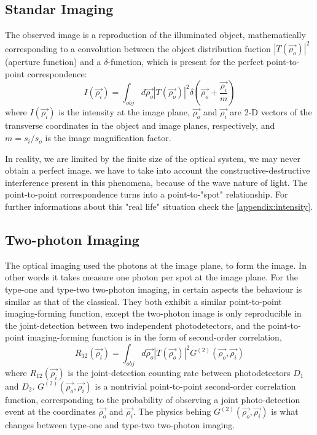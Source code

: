 \subsection{Standar Imaging}

The observed image is a reproduction of the illuminated object, mathematically
corresponding to a convolution between the object distribution fuction $ |T(\vec{\rho_o})|^2$ (aperture function) and a $\delta$-function, which is present for the perfect
point-to-point correspondence\cite{introquantumoptics}:
\begin{equation}
I(\vec{\rho_i})=\int_{obj} d\vec{\rho_o} |T(\vec{\rho_o})|^2 \delta(\vec{\rho_o}+\frac{\vec{\rho_i}}{m})
\end{equation}
where $I(\vec{\rho_i})$ is the intensity at the image plane, $\vec{\rho_o}$ and $\vec{\rho_i}$ are 2-D vectors of the
transverse coordinates in the object and image planes, respectively, and
$m=s_i/s_o$ is the image magnification factor.

In reality, we are limited by the finite size of the optical system, we may never obtain a perfect image.
we have to take into account the constructive-destructive interference present
in this phenomena, because of the wave nature of light. The point-to-point correspondence turns into a point-to-"spot" relationship.
For further informations about this "real life" situation check the \ref{appendix:intensity}.



\subsection{Two-photon Imaging}


The optical imaging used the photons at the image plane, to form the image. In other 
words it takes measure one photon per spot at the image plane. For the type-one and type-two
two-photon imaging, in certain aspects the behaviour is similar as that of the classical.
They both exhibit a similar point-to-point imaging-forming function, except the 
two-photon image is only reproducible in the joint-detection between two independent photodetectors,
and the point-to-point imaging-forming function is in the form of second-order correlation,
\begin{equation}
R_{12}(\vec{\rho_i})=\int_{obj} d\vec{\rho_o} |T(\vec{\rho_o})|^2 G^{(2)}(\vec{\rho_o},\vec{\rho_i})
\end{equation}
where $R_{12}(\vec{\rho_i})$ is the joint-detection counting rate between photodetectors $D_1$ and $D_2$.
$G^{(2)}(\vec{\rho_o},\vec{\rho_i})$ is a nontrivial point-to-point second-order correlation
function, corresponding to the probability of observing a joint photo-detection event
at the coordinates $\vec{\rho_o}$ and $\vec{\rho_i}$. The physics behing $G^{(2)}(\vec{\rho_o},\vec{\rho_i})$
is what changes between type-one and type-two two-photon imaging.

